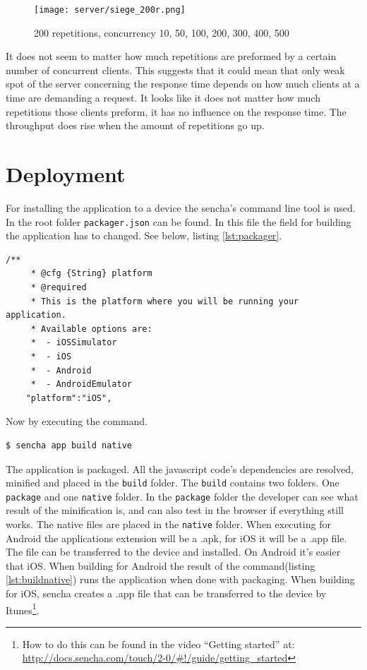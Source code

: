 \begin{figure}[H]
\center
\texttt{[image: server/siege\_200r.png]}
\caption{200 repetitions, concurrency 10, 50, 100, 200, 300, 400, 500}
\end{figure}

It does not seem to matter how much repetitions are preformed by a certain number of concurrent clients. This suggests that it could mean that only weak spot of the server concerning the response time depends on how much clients at a time are demanding a request. It looks like it does not matter how much repetitions those clients preform, it has no influence on the response time.
The throughput does rise when the amount of repetitions go up. 

\section{Deployment}
For installing the application to a device the sencha's command line tool is used. In the root folder \texttt{packager.json} can be found. In this file the field for building the application has to changed. See below, listing \ref{lst:packager}.
\begin{lstlisting}[caption={packager.json},label={lst:packager}]
	/**
	 * @cfg {String} platform
	 * @required
	 * This is the platform where you will be running your application.
	 * Available options are:
	 *  - iOSSimulator
	 *  - iOS
	 *  - Android
	 *  - AndroidEmulator
	"platform":"iOS",
\end{lstlisting}
Now by executing the command.
\label{appnative}
\begin{lstlisting}[caption={command to build native},label={lst:buildnative}]
$ sencha app build native
\end{lstlisting}
The application is packaged. All the javascript code's dependencies are resolved, minified and placed in the \texttt{build} folder. The \texttt{build} contains two folders. One \texttt{package} and one \texttt{native} folder. In the \texttt{package} folder the developer can see what result of the minification is, and can also test in the browser if everything still works. The native files are placed in the \texttt{native} folder. When executing for Android the applications extension will be a .apk, for iOS it will be a .app file.  The file can be transferred to the device and installed. On Android it's easier that iOS. When building for Android the result of the command(listing \ref{lst:buildnative}) runs the application when done with packaging. When building for iOS, sencha creates a .app file that can be transferred to the device by Itunes\footnote{How to do this can be found in the video ``Getting started'' at: \url{http://docs.sencha.com/touch/2-0/\#!/guide/getting\_started}}.

